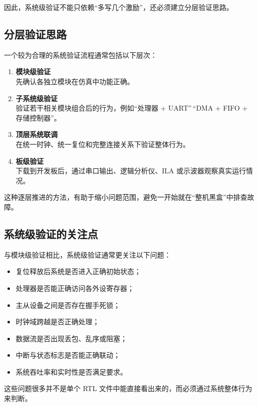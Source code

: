 因此，系统级验证不能只依赖``多写几个激励''，还必须建立分层验证思路。

\subsection{分层验证思路}\label{ux5206ux5c42ux9a8cux8bc1ux601dux8def}

一个较为合理的系统验证流程通常包括以下层次：

\begin{enumerate}
\def\labelenumi{\arabic{enumi}.}
\item
  \textbf{模块级验证}\\
  先确认各独立模块在仿真中功能正确。
\item
  \textbf{子系统级验证}\\
  验证若干相关模块组合后的行为，例如``处理器 + UART''\,``DMA + FIFO +
  存储控制器''。
\item
  \textbf{顶层系统联调}\\
  在统一时钟、统一复位和完整连接关系下验证整体行为。
\item
  \textbf{板级验证}\\
  下载到开发板后，通过串口输出、逻辑分析仪、ILA
  或示波器观察真实运行情况。
\end{enumerate}

这种逐层推进的方法，有助于缩小问题范围，避免一开始就在``整机黑盒''中排查故障。

\subsection{系统级验证的关注点}\label{ux7cfbux7edfux7ea7ux9a8cux8bc1ux7684ux5173ux6ce8ux70b9}

与模块级验证相比，系统级验证通常更关注以下问题：

\begin{itemize}
\tightlist
\item
  复位释放后系统是否进入正确初始状态；
\item
  处理器是否能正确访问各外设寄存器；
\item
  主从设备之间是否存在握手死锁；
\item
  时钟域跨越是否正确处理；
\item
  数据流是否出现丢包、乱序或阻塞；
\item
  中断与状态标志是否能正确联动；
\item
  系统吞吐率和实时性是否满足要求。
\end{itemize}

这些问题很多并不是单个 RTL
文件中能直接看出来的，而必须通过系统整体行为来判断。

